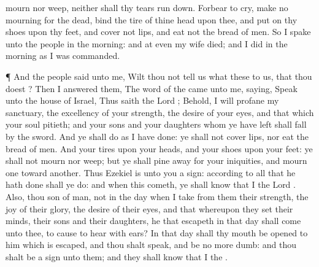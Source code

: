 {mourn nor
weep, neither shall thy
tears run
down.
Forbear to
cry,
make no
mourning for the
dead,
bind the tire of thine
head upon thee, and put
on thy
shoes upon thy
feet, and
cover not
{}
lips, and
eat not the
bread of
men.
So I
spake unto the
people in the
morning: and at
even my
wife
died; and I
did in the
morning as I was
commanded.
\par }{\PP {}¶ And the
people
said unto me, Wilt thou not
tell us what these
{} to us, that thou
doest
{}?
Then I
answered them, The
word of the
{} came unto me,
saying,
Speak unto the
house of
Israel, Thus
saith the
Lord
{}; Behold, I will
profane my
sanctuary, the
excellency of your
strength, the
desire of your
eyes, and that which your
soul
pitieth; and your
sons and your
daughters whom ye have
left shall
fall by the
sword.
And ye shall
do as I have
done: ye shall not
cover
{}
lips, nor
eat the
bread of
men.
And your
tires
{} upon your
heads, and your
shoes upon your
feet: ye shall not
mourn nor
weep; but ye shall pine
away for your
iniquities, and
mourn
one toward
another.
Thus
Ezekiel is unto you a
sign: according to all that he hath
done shall ye
do: and when this
cometh, ye shall
know that I
{} the
Lord
{}.
Also, thou
son of
man,
{} not
{} in the
day when I
take from them their
strength, the
joy of their
glory, the
desire of their
eyes, and that whereupon they
set their
minds, their
sons and their
daughters,
 he that
escapeth in that
day shall
come unto thee, to cause
{} to
hear
{} with
{}
ears?
In that
day shall thy
mouth be
opened to him which is
escaped, and thou shalt
speak, and be no more
dumb: and thou shalt be a
sign unto them; and they shall
know that I
{} the
{}.

}
